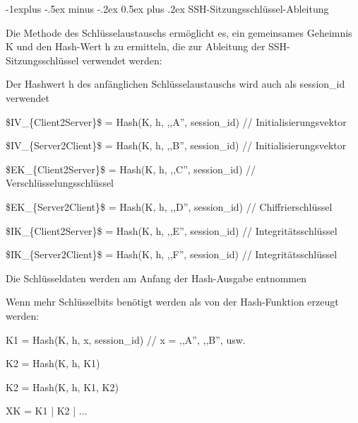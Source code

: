 \documentclass[a4paper]{article}
\makeatletter
\renewcommand{\subsection}{\@startsection{subsection}{2}{0mm}%
 {-1explus -.5ex minus -.2ex}%
 {0.5ex plus .2ex}%
 {\normalfont\normalsize\bfseries}}
\makeatother
\begin{document}
\begin{multicols}{3}
\begin{itemize*}
            \subsection{SSH-Sitzungsschlüssel-Ableitung}
            \begin{itemize*}
                  \item       Die Methode des Schlüsselaustauschs ermöglicht es, ein gemeinsames
                  Geheimnis K und den Hash-Wert h zu ermitteln, die zur Ableitung der
                  SSH-Sitzungsschlüssel verwendet werden:
                  \begin{itemize*}
                        \item Der Hashwert h des anfänglichen Schlüsselaustauschs wird auch als session\_id verwendet
                        \item \$IV\_\{Client2Server\}\$ = Hash(K, h, ,,A'', session\_id) // Initialisierungsvektor
                        \item \$IV\_\{Server2Client\}\$ = Hash(K, h, ,,B'', session\_id) // Initialisierungsvektor
                        \item \$EK\_\{Client2Server\}\$ = Hash(K, h, ,,C'', session\_id) // Verschlüsselungsschlüssel
                        \item \$EK\_\{Server2Client\}\$ = Hash(K, h, ,,D'', session\_id) // Chiffrierschlüssel
                        \item \$IK\_\{Client2Server\}\$ = Hash(K, h, ,,E'', session\_id) // Integritätsschlüssel
                        \item \$IK\_\{Server2Client\}\$ = Hash(K, h, ,,F'', session\_id) // Integritätsschlüssel
                  \end{itemize*}
                  \item       Die Schlüsseldaten werden am Anfang der Hash-Ausgabe entnommen
                  \item       Wenn mehr Schlüsselbits benötigt werden als von der Hash-Funktion
                  erzeugt werden:
                  \begin{itemize*}
                        \item K1 = Hash(K, h, x, session\_id) // x = ,,A'', ,,B'', usw.
                        \item K2 = Hash(K, h, K1)
                        \item K2 = Hash(K, h, K1, K2)
                        \item XK = K1 \textbar| K2 \textbar| ...
                  \end{itemize*}
            \end{itemize*}


\end{itemize*}
\end{multicols}
\end{document}
